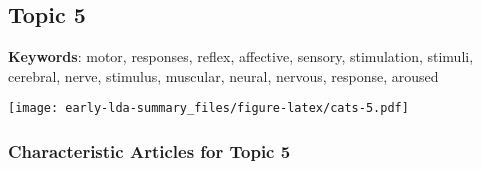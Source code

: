 \documentclass[
]{article}
\begin{document}
\newpage

\hypertarget{topic-5}{%
\subsection{Topic 5}\label{topic-5}}

\textbf{Keywords}: motor, responses, reflex, affective, sensory,
stimulation, stimuli, cerebral, nerve, stimulus, muscular, neural,
nervous, response, aroused

\texttt{[image: early-lda-summary\_files/figure-latex/cats-5.pdf]}
\newpage 

\hypertarget{characteristic-articles-for-topic-5}{%
\subsubsection{Characteristic Articles for Topic
5}\label{characteristic-articles-for-topic-5}}
\end{document}
